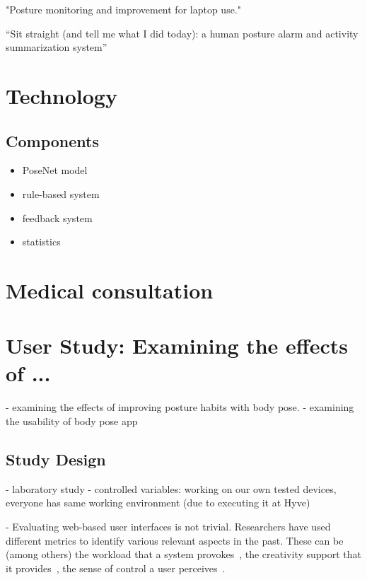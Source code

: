 
"Posture monitoring and improvement for laptop use."~\cite{demmans2007posture}

“Sit straight (and tell me what I did today): a human posture alarm and activity summarization system”~\cite{jaimes2005sit}

\section{Technology} %
\subsection{Components} %
\begin{itemize}
    \item PoseNet model
    \item rule-based system
    \item feedback system
    \item statistics
\end{itemize}

\section{Medical consultation} %

\section{User Study: Examining the effects of ...} %
\label{user-study-1}
- examining the effects of improving posture habits with body pose.
- examining the usability of body pose app

\subsection{Study Design} %
\label{us1-study-design}
- laboratory study
- controlled variables: working on our own tested devices, everyone has same working environment (due to executing it at Hyve)


- Evaluating web-based user interfaces is not trivial. %
Researchers have used different metrics to identify various relevant aspects in the past. These can be (among others) the workload that a system provokes~\cite{hart1988development,hart2006nasa}, the creativity support that it provides~\cite{cherry2014quantifying}, the sense of control a user perceives~\cite{dong2015development}.

